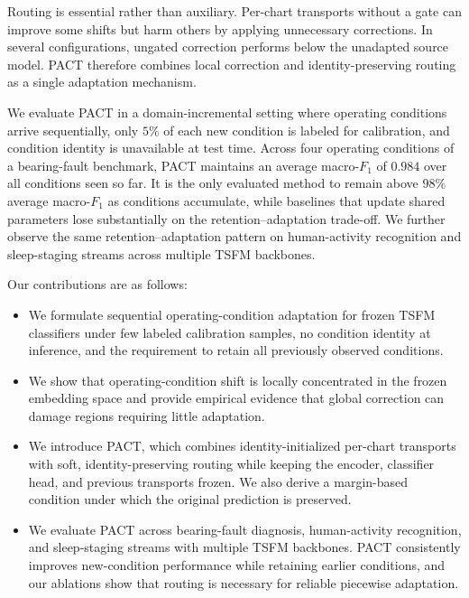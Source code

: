 \documentclass[letterpaper]{article} %
\begin{document}
Routing is essential rather than auxiliary. Per-chart transports without
a gate can improve some shifts but harm others by applying unnecessary
corrections. In several configurations, ungated correction performs
below the unadapted source model. PACT therefore combines local correction
and identity-preserving routing as a single adaptation mechanism.

We evaluate PACT in a domain-incremental setting where operating
conditions arrive sequentially, only $5\%$ of each new condition is
labeled for calibration, and condition identity is unavailable at test
time. Across four operating conditions of a bearing-fault benchmark,
PACT maintains an average macro-$F_1$ of $0.984$ over all conditions seen
so far. It is the only evaluated method to remain above $98\%$ average
macro-$F_1$ as conditions accumulate, while baselines that update shared
parameters lose substantially on the retention--adaptation trade-off. We further
observe the same retention--adaptation pattern on human-activity
recognition and sleep-staging streams across multiple TSFM backbones.

Our contributions are as follows:

\begin{itemize}
    \item We formulate sequential operating-condition adaptation for
    frozen TSFM classifiers under few labeled calibration samples, no
    condition identity at inference, and the requirement to retain all
    previously observed conditions.

    \item We show that operating-condition shift is locally concentrated
    in the frozen embedding space and provide empirical evidence that
    global correction can damage regions requiring little adaptation.

    \item We introduce PACT, which combines identity-initialized
    per-chart transports with soft, identity-preserving routing while
    keeping the encoder, classifier head, and previous transports frozen.
    We also derive a margin-based condition under which the original
    prediction is preserved.

    \item We evaluate PACT across bearing-fault diagnosis,
    human-activity recognition, and sleep-staging streams with multiple
    TSFM backbones. PACT consistently improves new-condition performance
    while retaining earlier conditions, and our ablations show that
    routing is necessary for reliable piecewise adaptation.
\end{itemize}
\end{document}
